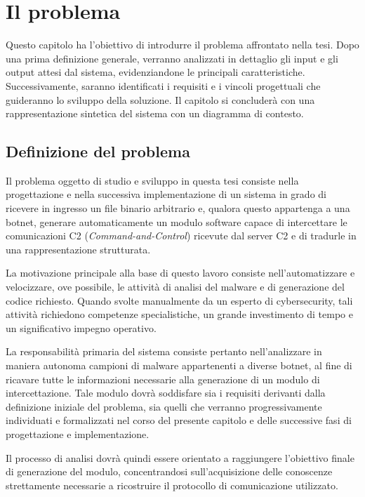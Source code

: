 \chapter{Il problema} %

Questo capitolo ha l'obiettivo di introdurre il problema affrontato nella tesi. Dopo una prima definizione generale, verranno analizzati in dettaglio gli input e gli output attesi dal sistema, evidenziandone le principali caratteristiche. Successivamente, saranno identificati i requisiti e i vincoli progettuali che guideranno lo sviluppo della soluzione. Il capitolo si concluderà con una rappresentazione sintetica del sistema con un diagramma di contesto.

\section{Definizione del problema} %

Il problema oggetto di studio e sviluppo in questa tesi consiste nella progettazione e nella successiva implementazione di un sistema in grado di ricevere in ingresso un file binario arbitrario e, qualora questo appartenga a una botnet, generare automaticamente un modulo software capace di intercettare le comunicazioni C2 (\textit{Command-and-Control}) ricevute dal server C2 e di tradurle in una rappresentazione strutturata.

La motivazione principale alla base di questo lavoro consiste nell'automatizzare e velocizzare, ove possibile, le attività di analisi del malware e di generazione del codice richiesto. Quando svolte manualmente da un esperto di cybersecurity, tali attività richiedono competenze specialistiche, un grande investimento di tempo e un significativo impegno operativo.

La responsabilità primaria del sistema consiste pertanto nell'analizzare in maniera autonoma campioni di malware appartenenti a diverse botnet, al fine di ricavare tutte le informazioni necessarie alla generazione di un modulo di intercettazione. Tale modulo dovrà soddisfare sia i requisiti derivanti dalla definizione iniziale del problema, sia quelli che verranno progressivamente individuati e formalizzati nel corso del presente capitolo e delle successive fasi di progettazione e implementazione.

Il processo di analisi dovrà quindi essere orientato a raggiungere l'obiettivo finale di generazione del modulo, concentrandosi sull'acquisizione delle conoscenze strettamente necessarie a ricostruire il protocollo di comunicazione utilizzato. 

